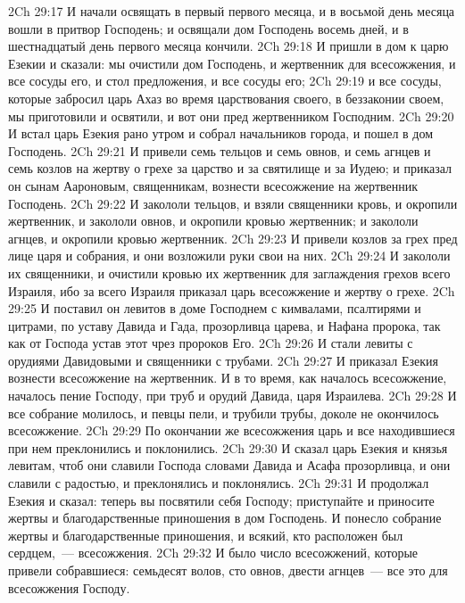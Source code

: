 \vs 2Ch 29:17 И начали освящать в первый  первого месяца, и в восьмой день  месяца вошли в притвор Господень; и освящали дом Господень восемь дней, и в шестнадцатый день первого месяца кончили.
\vs 2Ch 29:18 И пришли в дом к царю Езекии и сказали: мы очистили дом Господень, и жертвенник для всесожжения, и все сосуды его, и стол  предложения, и все сосуды его;
\vs 2Ch 29:19 и все сосуды, которые забросил царь Ахаз во время царствования своего, в беззаконии своем, мы приготовили и освятили, и вот они пред жертвенником Господним.
\rsbpar\vs 2Ch 29:20 И встал царь Езекия рано утром и собрал начальников города, и пошел в дом Господень.
\vs 2Ch 29:21 И привели семь тельцов и семь овнов, и семь агнцев и семь козлов на жертву о грехе за царство и за святилище и за Иудею; и приказал он сынам Аароновым, священникам, вознести всесожжение на жертвенник Господень.
\vs 2Ch 29:22 И закололи тельцов, и взяли священники кровь, и окропили жертвенник, и закололи овнов, и окропили кровью жертвенник; и закололи агнцев, и окропили кровью жертвенник.
\vs 2Ch 29:23 И привели козлов за грех пред лице царя и собрания, и они возложили руки свои на них.
\vs 2Ch 29:24 И закололи их священники, и очистили кровью их жертвенник для заглаждения грехов всего Израиля, ибо за всего Израиля приказал царь  всесожжение и жертву о грехе.
\vs 2Ch 29:25 И поставил он левитов в доме Господнем с кимвалами, псалтирями и цитрами, по уставу Давида и Гада, прозорливца царева, и Нафана пророка, так как от Господа  устав этот чрез пророков Его.
\vs 2Ch 29:26 И стали левиты с  орудиями Давидовыми и священники с трубами.
\vs 2Ch 29:27 И приказал Езекия вознести всесожжение на жертвенник. И в то время, как началось всесожжение, началось пение Господу, при  труб и орудий Давида, царя Израилева.
\vs 2Ch 29:28 И все собрание молилось, и певцы пели, и трубили трубы, доколе не окончилось всесожжение.
\vs 2Ch 29:29 По окончании же всесожжения царь и все находившиеся при нем преклонились и поклонились.
\vs 2Ch 29:30 И сказал царь Езекия и князья левитам, чтоб они славили Господа словами Давида и Асафа прозорливца, и они славили с радостью, и преклонялись и поклонялись.
\vs 2Ch 29:31 И продолжал Езекия и сказал: теперь вы посвятили себя Господу; приступайте и приносите жертвы и благодарственные приношения в дом Господень. И понесло  собрание жертвы и благодарственные приношения, и всякий, кто расположен был сердцем,~--- всесожжения.
\vs 2Ch 29:32 И было число всесожжений, которые привели собравшиеся: семьдесят волов, сто овнов, двести агнцев~--- все это для всесожжения Господу.
